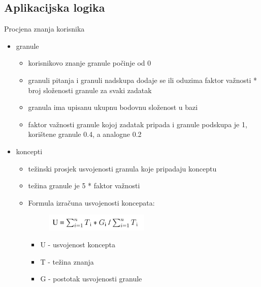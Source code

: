 \documentclass[times, utf8, numeric]{beamer}
\begin{document}
\subsection{Aplikacijska logika}
\begin{frame}{Procjena znanja korisnika}
\begin{itemize}
	\item granule
	\begin{itemize}
		\item korisnikovo znanje granule počinje od 0
		\item granuli pitanja i granuli nadskupa dodaje se ili oduzima faktor važnosti * broj složenosti granule za svaki zadatak
		\item granula ima upisanu ukupnu bodovnu složenost u bazi
		\item faktor važnosti granule kojoj zadatak pripada i granule podskupa je 1, korištene granule 0.4, a analogne 0.2
	\end{itemize}
	\item koncepti
	\begin{itemize}
		\item težinski prosjek usvojenosti granula koje pripadaju konceptu
		\item težina granule je 5 * faktor važnosti
		\item Formula izračuna usvojenosti koncepata:
		\begin{figure}[forum]
			\centering
			\includegraphics[width=0.5\textwidth,height=0.3\textheight,keepaspectratio]{img/formula.png}
			\label{fig:form}
		\end{figure}
		\begin{itemize}
		\item U - usvojenost koncepta
		\item T - težina znanja
		\item G - postotak usvojenosti granule
		\end{itemize}
	\end{itemize}
\end{itemize}
\end{frame}
\end{document}

